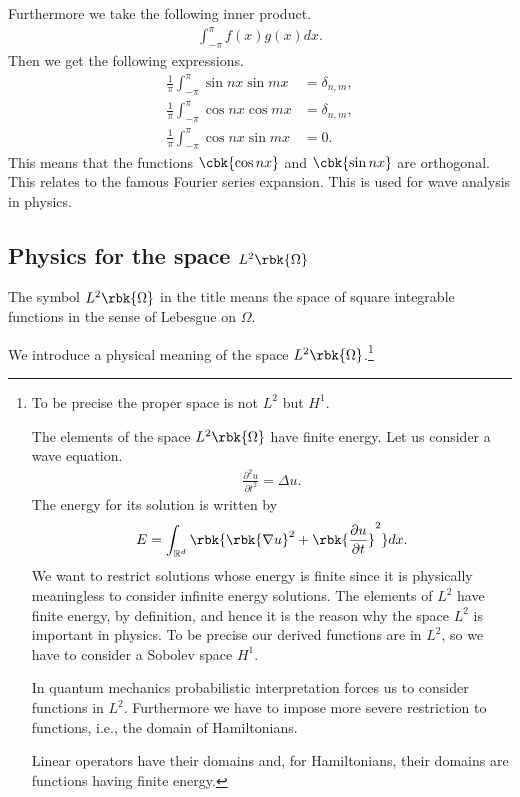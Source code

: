 \documentclass[openany, a4paper, oneside]{jsbook}
\begin{document}
Furthermore we take the following inner product.
\begin{align}
 \int_{- \pi}^{\pi} f(x) g(x) dx.
\end{align}
Then we get the following expressions.
\begin{align}
 \frac{1}{\pi} \int_{-\pi}^{\pi} \sin nx \sin mx
 &=
 \delta_{n,m}, \\
 \frac{1}{\pi} \int_{-\pi}^{\pi} \cos nx \cos mx
 &=
 \delta_{n,m}, \\
 \frac{1}{\pi} \int_{-\pi}^{\pi} \cos nx \sin mx
 &= 0.
\end{align}
This means that the functions $\cbk{\cos nx}$ and $\cbk{\sin nx}$ are orthogonal.
This relates to the famous Fourier series expansion.
This is used for wave analysis in physics.
\subsection{Physics for the space $L^2 \rbk{\Omega}$}

The symbol $L^2 \rbk{\Omega}$ in the title means
the space of square integrable functions in the sense of Lebesgue on $\Omega$.

We introduce a physical meaning of the space $L^2 \rbk{\Omega}$.\footnote{To be precise the proper space is not $L^2$ but $H^1$.

The elements of the space $L^2 \rbk{\Omega}$ have finite energy.
Let us consider a wave equation.
\begin{align}
 \frac{\partial^2 u}{\partial t^2}
 =
 \Delta u.
\end{align}
The energy for its solution is written by
\begin{align}
 E
 =
 \int_{\mathbb{R}^d} \rbk{\rbk{\nabla u}^2 + \rbk{\frac{\partial u}{\partial t}}^2}dx.
\end{align}
We want to restrict solutions whose energy is finite
since it is physically meaningless to consider infinite energy solutions.
The elements of $L^2$ have finite energy, by definition,
and hence it is the reason why the space $L^2$ is important in physics.
To be precise our derived functions are in $L^2$, so
we have to consider a Sobolev space $H^1$.

In quantum mechanics probabilistic interpretation forces us to
consider functions in $L^2$.
Furthermore we have to impose more severe restriction to functions,
i.e., the domain of Hamiltonians.

Linear operators have their domains
and, for Hamiltonians, their domains are functions having finite energy.}
\end{document}
